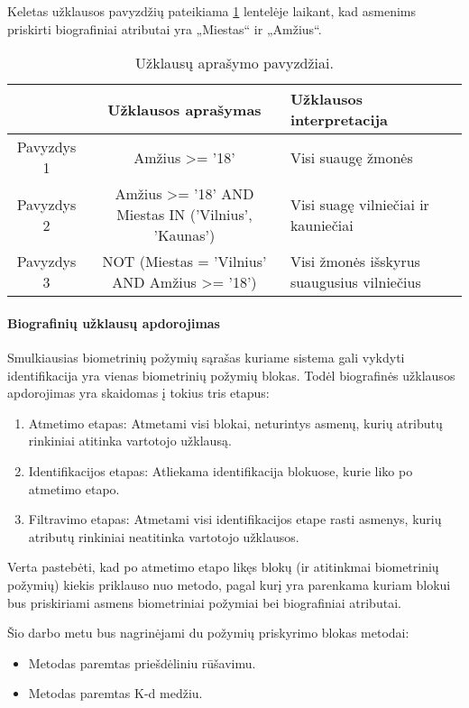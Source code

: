 Keletas užklausos pavyzdžių pateikiama \ref{tab:queryExamples} lentelėje laikant, kad asmenims priskirti biografiniai atributai yra „Miestas“ ir „Amžius“.

\begin{table}[H]\footnotesize
	\centering
	\begin{tabular}{|c|c|l|}
		\hline
		& {\bf Užklausos aprašymas} & {\bf Užklausos interpretacija} \\
		\hline
		Pavyzdys 1 & Amžius >= '18' & Visi suaugę žmonės\\
		\hline
		Pavyzdys 2 & Amžius >= '18' AND Miestas IN ('Vilnius', 'Kaunas') & Visi suagę vilniečiai ir kauniečiai\\
		\hline
		Pavyzdys 3 & NOT (Miestas = 'Vilnius' AND Amžius >= '18') & Visi žmonės išskyrus suaugusius vilniečius\\
		\hline
	\end{tabular}
	\caption{Užklausų aprašymo pavyzdžiai.}
	\label{tab:queryExamples}
\end{table}



\paragraph{Biografinių užklausų apdorojimas}

Smulkiausias biometrinių požymių sąrašas kuriame sistema \cite{NeurotechnologyMegamatcherAccelerator} gali vykdyti identifikacija yra vienas biometrinių požymių blokas.
Todėl biografinės užklausos apdorojimas yra skaidomas į tokius tris etapus:
\begin{enumerate}
	\item Atmetimo etapas: Atmetami visi blokai, neturintys asmenų, kurių atributų rinkiniai atitinka vartotojo užklausą.
	\item Identifikacijos etapas: Atliekama identifikacija blokuose, kurie liko po atmetimo etapo.
	\item Filtravimo etapas: Atmetami visi identifikacijos etape rasti asmenys, kurių atributų rinkiniai neatitinka vartotojo užklausos.
\end{enumerate}

Verta pastebėti, kad po atmetimo etapo likęs blokų (ir atitinkmai biometrinių požymių) kiekis priklauso nuo metodo, pagal kurį yra parenkama kuriam blokui bus priskiriami asmens biometriniai požymiai bei biografiniai atributai.

Šio darbo metu bus nagrinėjami du požymių priskyrimo blokas metodai:
\begin{itemize}
		\item Metodas paremtas priešdėliniu rūšavimu.
		\item Metodas paremtas K-d medžiu.
\end{itemize}

